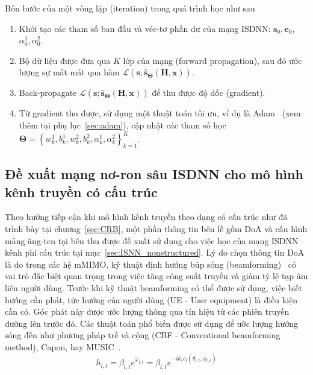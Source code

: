 Bốn bước của một vòng lặp (iteration) trong quá trình học như sau
\begin{enumerate}
    \item Khởi tạo các tham số ban đầu và véc-tơ phần dư của mạng ISDNN: $\mathbf{s}_0, \mathbf{e}_0$, $\alpha^1_0, \alpha^2_0$.

    \item Bộ dữ liệu được đưa qua $K$ lớp của mạng (forward propagation), sau đó ước lượng sự mất mát qua hàm $\mathcal{L}(\mathbf{s}; \hat{\mathbf{s}}_{\boldsymbol{\Theta}}(\mathbf{H}, \mathbf{x}))$.

    \item Back-propagate $\mathcal{L}(\mathbf{s}; \hat{\mathbf{s}}_{\boldsymbol{\Theta}}(\mathbf{H}, \mathbf{x}))$ để thu được độ dốc (gradient).

    \item Từ gradient thu được, sử dụng một thuật toán tối ưu, ví dụ là Adam~\cite{Diederik2014} (xem thêm tại phụ lục~\ref{sec:adam}), cập nhật các tham số học $\boldsymbol{\Theta}=\left\{w^1_{k}, b^1_{k}, w^2_{k}, b^2_{k}, \alpha^1_k, \alpha^2_k \right\}_{k=1}^K$.
\end{enumerate}

\subsection{Đề xuất mạng nơ-ron sâu ISDNN cho mô hình kênh truyền có cấu trúc}

Theo hướng tiếp cận khi mô hình kênh truyền theo dạng có cấu trúc như đã trình bày tại chương~\ref{sec:CRB}, một phần thông tin bên lề gồm DoA và cấu hình mảng ăng-ten tại bên thu được đề xuất sử dụng cho việc học của mạng ISDNN kênh phi cấu trúc tại mục~\ref{sec:ISNN_nonstructured}. Lý do chọn thông tin DoA là do trong các hệ mMIMO, kỹ thuật định hướng búp sóng (beamforming)~\cite{shaik2021} có vai trò đặc biệt quan trọng trong việc tăng công suất truyền và giảm tỷ lệ tạp âm liên người dùng. Trước khi kỹ thuật beamforming có thể được sử dụng, việc biết hướng cần phát, tức hướng của người dùng (UE - User equipment) là điều kiện cần có. Góc phát này được ước lượng thông qua tín hiệu từ các phiên truyền đường lên trước đó. Các thuật toán phổ biến được sử dụng để ước lượng hướng sóng đến như phương pháp trễ và cộng (CBF - Conventional beamforming method), Capon, hay MUSIC~\cite{Wang2016}. 
\begin{equation}
    \label{eq:28}
    h_{l, t} = \beta_{l, t} e^{\varphi_{l, t}} = \beta_{l, t} e^{-i k_s c_l (\theta_{l, t}, \phi_{l, t})}
\end{equation}

